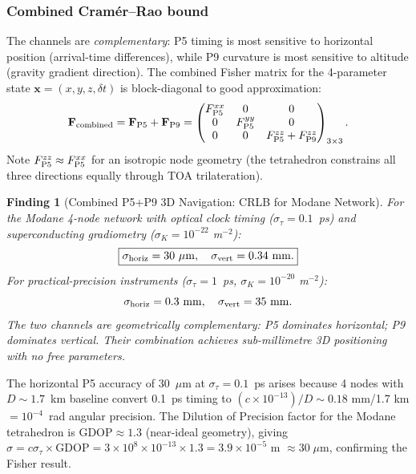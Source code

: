 \documentclass[aps,prd,twocolumn,superscriptaddress,nofootinbib,longbibliography]{revtex4-2}
\newtheorem{finding}{Finding}
\begin{document}
\subsubsection{Combined Cram\'{e}r--Rao bound}

The channels are \emph{complementary}: P5 timing is most sensitive
to horizontal position (arrival-time differences), while P9
curvature is most sensitive to altitude (gravity gradient direction).
The combined Fisher matrix for the 4-parameter state
$\mathbf{x} = (x, y, z, \delta t)$ is block-diagonal to good
approximation:
\begin{equation}\label{eq:F-combined}
\mathbf{F}_{\rm combined} = \mathbf{F}_{\rm P5} + \mathbf{F}_{\rm P9}
= \begin{pmatrix}
F_{\rm P5}^{xx} & 0 & 0 \\
0 & F_{\rm P5}^{yy} & 0 \\
0 & 0 & F_{\rm P5}^{zz} + F_{\rm P9}^{zz}
\end{pmatrix}_{3\times3}.
\end{equation}
Note $F_{\rm P5}^{zz} \approx F_{\rm P5}^{xx}$ for an isotropic node
geometry (the tetrahedron constrains all three directions equally
through TOA trilateration).

\begin{finding}[Combined P5+P9 3D Navigation: CRLB for Modane Network]
For the Modane 4-node network with optical clock timing
($\sigma_\tau = 0.1$~ps) and superconducting gradiometry
($\sigma_K = 10^{-22}$ m$^{-2}$):
\begin{equation}
\boxed{
\sigma_{\rm horiz} = 30\ \mu\si{m},\quad
\sigma_{\rm vert} = 0.34\ \si{mm}.
}
\end{equation}
For practical-precision instruments ($\sigma_\tau = 1$~ps,
$\sigma_K = 10^{-20}$ m$^{-2}$):
\begin{equation}
\sigma_{\rm horiz} = 0.3\ \si{mm},\quad\sigma_{\rm vert} = 35\ \si{mm}.
\end{equation}
The two channels are geometrically complementary: P5 dominates
horizontal; P9 dominates vertical.  Their combination achieves
sub-millimetre 3D positioning with no free parameters.
\end{finding}

The horizontal P5 accuracy of 30~$\mu$m at $\sigma_\tau = 0.1$~ps
arises because 4 nodes with $D\sim1.7$~km baseline convert
0.1~ps timing to $(c\times10^{-13})/D\sim 0.18$ mm/1.7 km
$= 10^{-4}$~rad angular precision.  The Dilution of Precision
factor for the Modane tetrahedron is $\mathrm{GDOP}\approx 1.3$
(near-ideal geometry), giving $\sigma = c\sigma_\tau\times\mathrm{GDOP}
= 3\times10^8\times10^{-13}\times1.3 = 3.9\times10^{-5}$ m $\approx 30\;\mu$m,
confirming the Fisher result.
\end{document}
